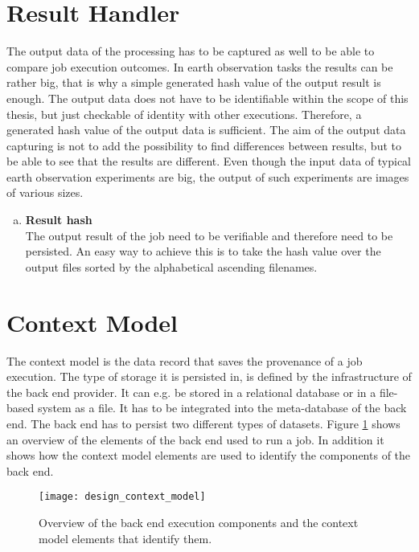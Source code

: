 \documentclass[draft,final]{vutinfth} %
\begin{document}
\section{Result Handler}\label{Design:Result Handler}
The output data of the processing has to be captured as well to be able to compare job execution outcomes. In earth observation tasks the results can be rather big, that is why a simple generated hash value of the output result is enough. The output data does not have to be identifiable within the scope of this thesis, but just checkable of identity with other executions. Therefore, a generated hash value of the output data is sufficient. The aim of the output data capturing is not to add the possibility to find differences between results, but to be able to see that the results are different. Even though the input data of typical earth observation experiments are big, the output of such experiments are images of various sizes.   

\begin{enumerate}[(f)]
	\item \textbf{Result hash} \\
	The output result of the job need to be verifiable and therefore need to be persisted. An easy way to achieve this is to take the hash value over the output files sorted by the alphabetical ascending filenames.
\end{enumerate}

 
\section{Context Model}\label{Design:Context Model}

The context model is the data record that saves the provenance of a job execution. The type of storage it is persisted in, is defined by the infrastructure of the back end provider. It can e.g. be stored in a relational database or in a file-based system as a file. It has to be integrated into the meta-database of the back end. The back end has to persist two different types of datasets. Figure \ref{fig:design_contextmodel} shows an overview of the elements of the back end used to run a job. In addition it shows how the context model elements are used to identify the components of the back end.

\begin{figure}[h]
	\centering
	\texttt{[image: design\_context\_model]}
	\caption{Overview of the back end execution components and the context model elements that identify them.}
	\label{fig:design_contextmodel} 
\end{figure}
\end{document}
